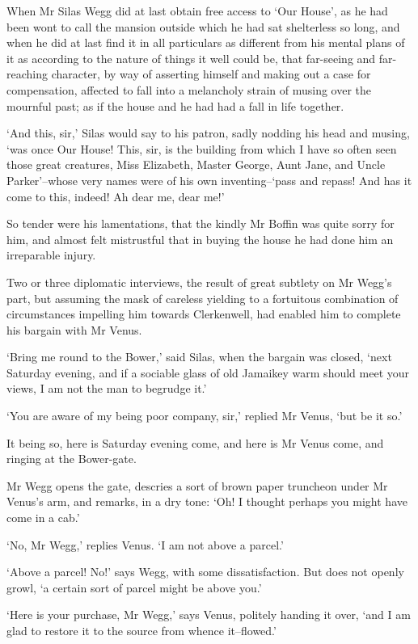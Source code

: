 When Mr Silas Wegg did at last obtain free access to ‘Our House’, as he
had been wont to call the mansion outside which he had sat shelterless
so long, and when he did at last find it in all particulars as different
from his mental plans of it as according to the nature of things it
well could be, that far-seeing and far-reaching character, by way of
asserting himself and making out a case for compensation, affected to
fall into a melancholy strain of musing over the mournful past; as if
the house and he had had a fall in life together.

‘And this, sir,’ Silas would say to his patron, sadly nodding his head
and musing, ‘was once Our House! This, sir, is the building from which I
have so often seen those great creatures, Miss Elizabeth, Master
George, Aunt Jane, and Uncle Parker’--whose very names were of his own
inventing--‘pass and repass! And has it come to this, indeed! Ah dear
me, dear me!’

So tender were his lamentations, that the kindly Mr Boffin was quite
sorry for him, and almost felt mistrustful that in buying the house he
had done him an irreparable injury.

Two or three diplomatic interviews, the result of great subtlety on Mr
Wegg’s part, but assuming the mask of careless yielding to a fortuitous
combination of circumstances impelling him towards Clerkenwell, had
enabled him to complete his bargain with Mr Venus.

‘Bring me round to the Bower,’ said Silas, when the bargain was closed,
‘next Saturday evening, and if a sociable glass of old Jamaikey warm
should meet your views, I am not the man to begrudge it.’

‘You are aware of my being poor company, sir,’ replied Mr Venus, ‘but be
it so.’

It being so, here is Saturday evening come, and here is Mr Venus come,
and ringing at the Bower-gate.

Mr Wegg opens the gate, descries a sort of brown paper truncheon under
Mr Venus’s arm, and remarks, in a dry tone: ‘Oh! I thought perhaps you
might have come in a cab.’

‘No, Mr Wegg,’ replies Venus. ‘I am not above a parcel.’

‘Above a parcel! No!’ says Wegg, with some dissatisfaction. But does not
openly growl, ‘a certain sort of parcel might be above you.’

‘Here is your purchase, Mr Wegg,’ says Venus, politely handing it over,
‘and I am glad to restore it to the source from whence it--flowed.’

